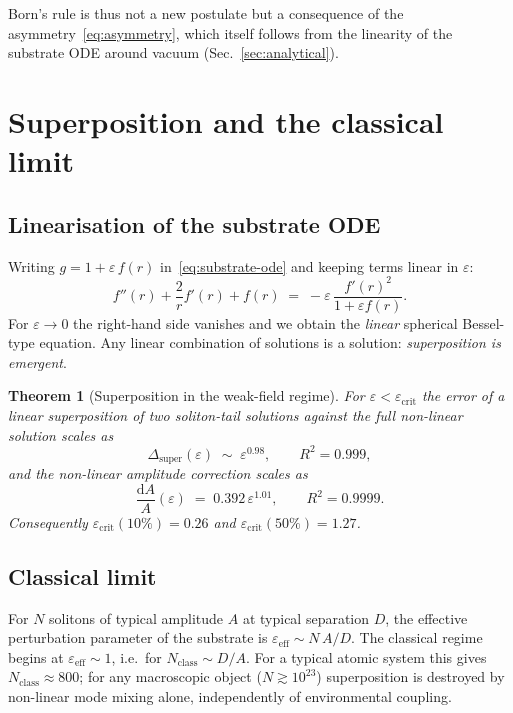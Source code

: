 \documentclass[11pt,a4paper]{article}
\newcommand{\eps}{\varepsilon}
\newtheorem{theorem}{Theorem}
\begin{document}
Born's rule is thus not a new postulate but a consequence of the
asymmetry~\eqref{eq:asymmetry}, which itself follows from the
linearity of the substrate ODE around vacuum (Sec.~\ref{sec:analytical}).

\section{Superposition and the classical limit}\label{sec:superposition}

\subsection{Linearisation of the substrate ODE}

Writing $g=1+\eps\,f(r)$ in~\eqref{eq:substrate-ode} and keeping
terms linear in $\eps$:
\begin{equation}\label{eq:linear}
  f''(r) + \frac{2}{r}f'(r) + f(r) \;=\;
   -\eps\,\frac{f'(r)^{2}}{1+\eps f(r)}.
\end{equation}
For $\eps\to 0$ the right-hand side vanishes and we obtain the
\emph{linear} spherical Bessel-type equation. Any linear combination
of solutions is a solution: \emph{superposition is emergent}.

\begin{theorem}[Superposition in the weak-field regime]\label{thm:superpos}
For $\eps<\eps_{\mathrm{crit}}$ the error of a linear superposition of
two soliton-tail solutions against the full non-linear solution scales
as
\begin{equation}
  \Delta_{\mathrm{super}}(\eps) \;\sim\; \eps^{0.98}, \qquad R^{2}=0.999,
\end{equation}
and the non-linear amplitude correction scales as
\begin{equation}\label{eq:nl-correction}
  \frac{\mathrm{d}A}{A}(\eps) \;=\; 0.392\,\eps^{1.01}, \qquad R^{2}=0.9999.
\end{equation}
Consequently $\eps_{\mathrm{crit}}(10\%)=0.26$ and
$\eps_{\mathrm{crit}}(50\%)=1.27$.
\end{theorem}

\subsection{Classical limit}

For $N$ solitons of typical amplitude $A$ at typical separation $D$,
the effective perturbation parameter of the substrate is
$\eps_{\mathrm{eff}}\sim N\,A/D$. The classical regime begins at
$\eps_{\mathrm{eff}}\sim 1$, i.e.\ for $N_{\mathrm{class}}\sim D/A$.
For a typical atomic system this gives $N_{\mathrm{class}}\approx 800$;
for any macroscopic object ($N\gtrsim10^{23}$) superposition is
destroyed by non-linear mode mixing alone, independently of
environmental coupling.
\end{document}
